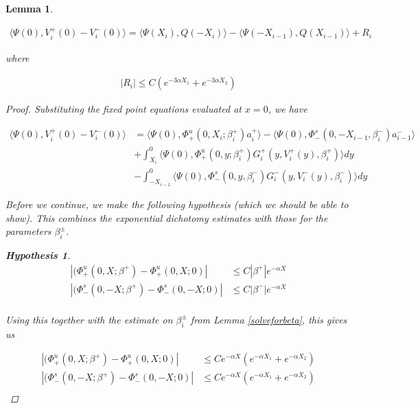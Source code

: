 \documentclass[12pt]{article}
\newtheorem{lemma}{Lemma}
\newtheorem{hypothesis}{Hypothesis}
\begin{document}

\begin{lemma}\label{jumplemma1}

\begin{align*}
\langle \Psi(0), V_i^+(0) - V_i^-(0) \rangle = 
\langle \Psi(X_i), Q(-X_i) \rangle - \langle \Psi(-X_{i-1}), Q(X_{i-1}) \rangle + R_i
\end{align*}

where 

\begin{align*}
|R_i| \leq C ( e^{-3 \alpha X_1} +  e^{-3 \alpha X_2} )
\end{align*}
\begin{proof}

Substituting the fixed point equations evaluated at $x = 0$, we have

\begin{align*}
\langle \Psi(0), V_i^+(0) - V_i^-(0) \rangle &= \langle \Psi(0), \Phi^u_+(0, X_i; \beta_i^+) a_i^+ \rangle
- \langle \Psi(0), \Phi^s_-(0, -X_{i-1}, \beta_i^-) a_{i-1}^- \rangle \\
&+ \int_{X_i}^0 \langle \Psi(0), \Phi_+^u(0, y; \beta_i^+) G_i^+(y, V_i^+(y),\beta_i^+) \rangle dy \\
&- \int_{-X_{i-1}}^0 \langle \Psi(0), \Phi_-^s(0, y, \beta_i^-) G_i^-(y, V_i^-(y),\beta_i^-) \rangle dy
\end{align*}

Before we continue, we make the following hypothesis (which we should be able to show). This combines the exponential dichotomy estimates with those for the parameters $\beta_i^\pm$.

\begin{hypothesis}\label{betaevolution}
\begin{align*}
|(\Phi_+^u(0, X; \beta^+) - \Phi_+^u(0, X; 0)| &\leq C |\beta^+| e^{-\alpha X} \\
|(\Phi_-^s(0, -X; \beta^+) - \Phi_-^s(0, -X; 0)| &\leq C |\beta^-| e^{-\alpha X} \\
\end{align*}
\end{hypothesis}

Using this together with the estimate on $\beta_i^\pm$ from Lemma \ref{solveforbeta}, this gives us

\begin{align*}
|(\Phi_+^u(0, X; \beta^+) - \Phi_+^u(0, X; 0)| &\leq C e^{-\alpha X} (e^{-\alpha X_1} + e^{-\alpha X_2})\\
|(\Phi_-^s(0, -X; \beta^+) - \Phi_-^s(0, -X; 0)| &\leq C e^{-\alpha X} (e^{-\alpha X_1} + e^{-\alpha X_2}) \\
\end{align*}


\end{proof}
\end{lemma}
\end{document}
